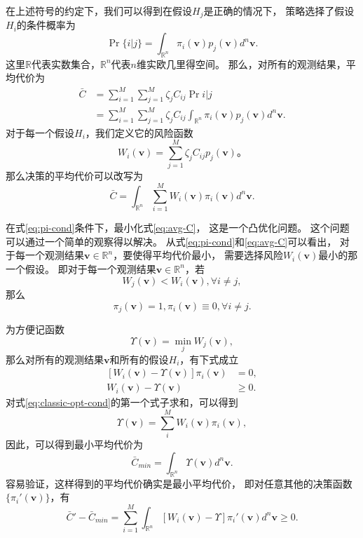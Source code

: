 在上述符号的约定下，我们可以得到在假设$H_j$是正确的情况下，
策略选择了假设$H_i$的条件概率为
\begin{equation}
\Pr\{i|j\} = \int_{\mathbb{R}^n} \pi_i(\bm{v}) p_j(\bm{v}) d^n \bm{v}.
\end{equation}
这里$\mathbb{R}$代表实数集合，$\mathbb{R}^n$代表$n$维实欧几里得空间。
那么，对所有的观测结果，平均代价为
\begin{equation}
\begin{split}
\bar{C} &= \sum_{i=1}^M \sum_{j=1}^M \zeta_j C_{ij} \Pr{i|j} \\
 &= \sum_{i=1}^M \sum_{j=1}^M \zeta_j C_{ij} \int_{\mathbb{R}^n} \pi_i(\bm{v}) p_j(\bm{v}) d^n \bm{v}.
\end{split}
\end{equation}
对于每一个假设$H_i$，我们定义它的风险函数
\begin{equation}
W_i(\bm{v}) = \sum_{j=1}^M \zeta_j C_{ij} p_j(\bm{v})。
\end{equation}
那么决策的平均代价可以改写为
\begin{equation}
\bar{C} =  \int_{\mathbb{R}^n} \sum_{i=1}^M W_i(\bm{v}) \pi_i(\bm{v}) d^n \bm{v}.
\label{eq:avg-C}
\end{equation}

在式\ref{eq:pi-cond}条件下，最小化式\ref{eq:avg-C}，
这是一个凸优化问题。
这个问题可以通过一个简单的观察得以解决。
从式\ref{eq:pi-cond}和\ref{eq:avg-C}可以看出，
对于每一个观测结果$\bm{v} \in \mathbb{R}^n $，要使得平均代价最小，
需要选择风险$W_i(\bm{v})$最小的那一个假设。
即对于每一个观测结果$\bm{v} \in \mathbb{R}^n $，若
\begin{equation}
W_j(\bm{v}) < W_i(\bm{v}), \forall i \neq j,
\end{equation}
那么
\begin{equation}
\pi_j(\bm{v})=1, \pi_i(\bm{v}) \equiv 0, \forall i \neq j.
\end{equation}

为方便记函数
\begin{equation}
\Upsilon(\bm{v}) = \min_j W_j(\bm{v}), 
\end{equation}
那么对所有的观测结果$\bm{v}$和所有的假设$H_i$，有下式成立
\begin{equation}
\begin{split}
[W_i(\bm{v}) - \Upsilon(\bm{v})] \pi_i(\bm{v}) &= 0,  \\
W_i(\bm{v}) - \Upsilon(\bm{v}) &\ge 0.
\label{eq:classic-opt-cond}
\end{split}
\end{equation}
对式\ref{eq:classic-opt-cond}的第一个式子求和，可以得到
\begin{equation}
\Upsilon(\bm{v}) = \sum_i^M W_i(\bm{v})\pi_i(\bm{v}), 
\end{equation}
因此，可以得到最小平均代价为
\begin{equation}
\bar{C}_{min} = \int_{\mathbb{R}^n} \Upsilon(\bm{v}) d^n \bm{v}. 
\end{equation}
容易验证，这样得到的平均代价确实是最小平均代价，
即对任意其他的决策函数$\{\pi_i'(\bm{v})\}$，有
\begin{equation}
\bar{C}' - \bar{C}_{min} = \sum_{i=1}^M \int_{\mathbb{R}^n} [W_i(\bm{v}) - \Upsilon] \pi_i'(\bm{v}) d^n \bm{v} \ge 0. 
\end{equation}


